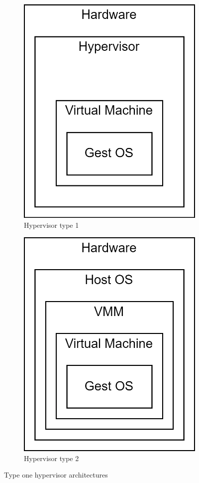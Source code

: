 \begin{figure}[H]
    \centering
    \begin{subfigure}{0.49\textwidth}
        \centering
        \includegraphics[width=0.75\linewidth]{images/hyp1.png} 
        \caption{Hypervisor type 1}
    \end{subfigure}
    \begin{subfigure}{0.49\textwidth}
        \centering
        \includegraphics[width=0.75\linewidth]{images/hyp2.png}
        \caption{Hypervisor type 2}
    \end{subfigure}
    \caption{Type one hypervisor architectures}
\end{figure}

